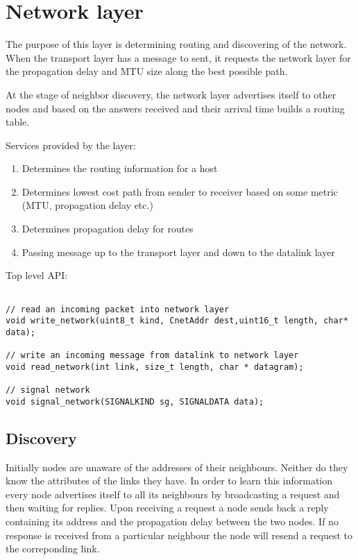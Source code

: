 \documentclass[11pt,a4paper,oneside]{report}
\begin{document}
\section*{Network layer} 
The purpose of this layer is determining routing and discovering of the
network. When the transport layer has a message to sent, it requests the
network layer for the propagation delay and MTU size along the best possible
path. 

At the stage of neighbor discovery, the network layer advertises itself to other
nodes and based on the answers received and their arrival time builds a routing
table.

Services provided by the layer:
\begin{enumerate}
  \item Determines the routing information for a host
  \item Determines lowest cost path from sender to receiver based on some metric
  (MTU, propagation delay etc.)
  \item Determines propagation delay for routes
  \item Passing message up to the transport layer and down to the datalink layer
\end{enumerate}
    
Top level API:
    
   \begin{lstlisting}

// read an incoming packet into network layer
void write_network(uint8_t kind, CnetAddr dest,uint16_t length, char* data);

// write an incoming message from datalink to network layer 
void read_network(int link, size_t length, char * datagram);

// signal network
void signal_network(SIGNALKIND sg, SIGNALDATA data);

  \end{lstlisting}  
            

\subsection*{Discovery}
Initially nodes are unaware of the addresses of their neighbours. Neither do they know the
attributes of the links they have. In order to learn this information every node advertises
itself to all its neighbours by broadcasting a request and then waiting for replies. Upon receiving 
a request a node sends back a reply containing its address and the propagation delay between the
two nodes. If no response is received from a particular neighbour the node will resend a request to the 
correponding link. 
    
\end{document}
